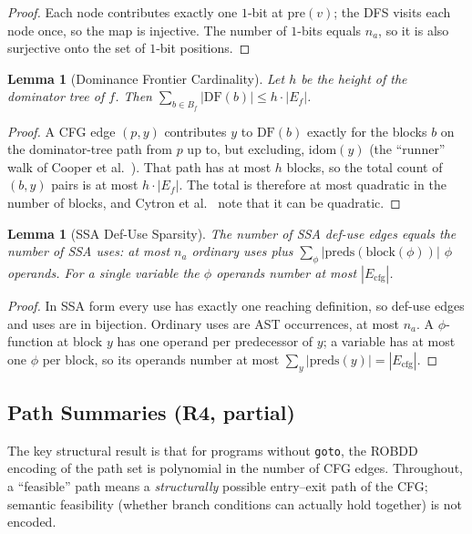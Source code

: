 \documentclass[journal,10pt,twoside]{IEEEtran}
\newtheorem{lemma}[theorem]{Lemma}
\newcommand{\DF}{\mathrm{DF}}
\newcommand{\idom}{\mathrm{idom}}
\newcommand{\pre}{\mathrm{pre}}
\begin{document}
\begin{proof}
Each node contributes exactly one $1$-bit at $\pre(v)$; the
DFS visits each node once, so the map is injective.
The number of $1$-bits equals $n_a$, so it is also surjective
onto the set of $1$-bit positions.
\end{proof}

\begin{lemma}[Dominance Frontier Cardinality]\label{lem:dfcard}
Let $h$ be the height of the dominator tree of $f$.  Then
$\sum_{b \in B_f} |\DF(b)| \le h\cdot|E_f|$.
\end{lemma}

\begin{proof}
A CFG edge $(p, y)$ contributes $y$ to $\DF(b)$ exactly for
the blocks $b$ on the dominator-tree path from $p$ up to, but
excluding, $\idom(y)$ (the ``runner'' walk of Cooper et
al.~\cite{cooper01}).  That path has at most $h$ blocks, so
the total count of $(b,y)$ pairs is at most $h\cdot|E_f|$.
The total is therefore at most quadratic in the number of
blocks, and Cytron et al.~\cite{cytron91} note that it can be
quadratic.
\end{proof}

\begin{lemma}[SSA Def-Use Sparsity]\label{lem:ssasparse}
The number of SSA def-use edges equals the number of SSA
uses: at most $n_a$ ordinary uses plus
$\sum_{\phi} |\mathrm{preds}(\mathrm{block}(\phi))|$ $\phi$
operands.  For a single variable the $\phi$ operands number
at most $|E_{\mathrm{cfg}}|$.
\end{lemma}

\begin{proof}
In SSA form every use has exactly one reaching definition, so
def-use edges and uses are in bijection.  Ordinary uses are
AST occurrences, at most $n_a$.  A $\phi$-function at block
$y$ has one operand per predecessor of $y$; a variable has at
most one $\phi$ per block, so its operands number at most
$\sum_y |\mathrm{preds}(y)| = |E_{\mathrm{cfg}}|$.
\end{proof}

\subsection{Path Summaries (R4, partial)}

The key structural result is that for programs without
\texttt{goto}, the ROBDD encoding of the path set is
polynomial in the number of CFG edges.  Throughout, a
``feasible'' path means a \emph{structurally} possible
entry--exit path of the CFG; semantic feasibility (whether
branch conditions can actually hold together) is not
encoded.
\end{document}
